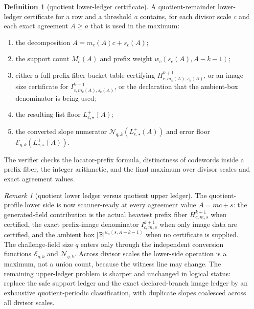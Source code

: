 \documentclass[11pt]{article}
\theoremstyle{definition}
\newtheorem{definition}[definition]{Definition}
\theoremstyle{remark}
\newtheorem{remark}[remark]{Remark}
\newcommand{\B}{\mathbb{B}}
\begin{document}
\begin{definition}[quotient lower-ledger certificate]
\label{def:quotient-lower-ledger-certificate}
A quotient-remainder lower-ledger certificate for a row and a threshold $a$
contains, for each divisor scale $c$ and each exact agreement $A\ge a$ that is
used in the maximum:
\begin{enumerate}[label=\textup{(\roman*)},leftmargin=2.2em]
\item the decomposition $A=m_c(A)c+s_c(A)$;
\item the support count $M_c(A)$ and prefix weight $w_c(s_c(A),A-k-1)$;
\item either a full prefix-fiber bucket table certifying
$H_{c,m_c(A),s_c(A)}^{k+1}$, or an image-size certificate for
$I_{c,m_c(A),s_c(A)}^{k+1}$, or the declaration that the ambient-box denominator
is being used;
\item the resulting list floor $L_{c,\star}^+(A)$;
\item the converted slope numerator
$\mathcal N_{q,k}(L_{c,\star}^+(A))$ and error floor
$\mathcal E_{q,k}(L_{c,\star}^+(A))$.
\end{enumerate}
The verifier checks the locator-prefix formula, distinctness of codewords inside
a prefix fiber, the integer arithmetic, and the final maximum over divisor
scales and exact agreement values.
\end{definition}

\begin{remark}[quotient lower ledger versus quotient upper ledger]
\label{rem:T1-lower-ledger-status}
The quotient-profile lower side is now scanner-ready at every agreement value
$A=mc+s$: the generated-field contribution is the actual heaviest prefix fiber
$H_{c,m,s}^{k+1}$ when certified, the exact prefix-image denominator
$I_{c,m,s}^{k+1}$ when only image data are certified, and the ambient box
$|\B|^{w_c(s,A-k-1)}$ when no certificate is supplied.  The challenge-field size
$q$ enters only through the independent conversion functions
$\mathcal E_{q,k}$ and $\mathcal N_{q,k}$.  Across divisor scales the lower-side
operation is a maximum, not a union count, because the witness line may change.
The remaining upper-ledger problem is sharper and unchanged in logical status:
replace the safe support ledger and the exact declared-branch image ledger by an
exhaustive quotient-periodic classification, with duplicate slopes coalesced
across all divisor scales.
\end{remark}
\end{document}
